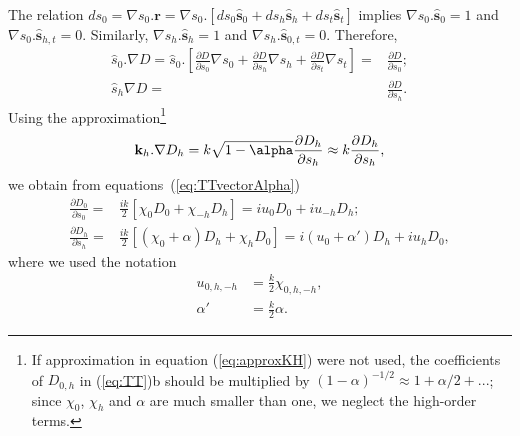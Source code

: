 \documentclass[preprint]{iucr}              %
\begin{document}
The relation $d s_0 = \nabla s_0 . \textbf{r}= \nabla s_0 . [ d s_0 \hat{\textbf{s}}_0 + d s_h \hat{\textbf{s}}_h + d s_t \hat{\textbf{s}}_t ]$ implies $\nabla s_0 . \hat{\textbf{s}}_0=1$ and $\nabla s_0 . \hat{\textbf{s}}_{h,t}=0$. Similarly, $\nabla s_h . \hat{\textbf{s}}_h=1$ and $\nabla s_h . \hat{\textbf{s}}_{0,t}=0$. Therefore, 
\begin{subequations}
\label{eq:equalities}
\begin{align}
\hat s_0 . \nabla D=
\hat s_0 . \left[ 
\frac{\partial D}{\partial s_0} \nabla s_0 + 
\frac{\partial D}{\partial s_h} \nabla s_h +
\frac{\partial D}{\partial s_t} \nabla s_t
\right] 
=& \frac{\partial D}{\partial s_0}
; \\
\hat s_h \nabla D =& 
\frac{\partial D}{\partial s_h}.
\end{align}
\end{subequations}
Using the approximation\footnote{
If approximation in equation (\ref{eq:approxKH}) were not used, the coefficients of $D_{0,h}$ in (\ref{eq:TT})b should be multiplied by $(1-\alpha)^{-1/2} \approx 1 + \alpha/2 + ...$; since $\chi_0$, $\chi_h$ and $\alpha$ are much smaller than one, we neglect the high-order terms.
}
\begin{equation}\label{eq:approxKH}
\textbf k_h . \nabla D_h = 
k \sqrt{1-\alpha} \frac{\partial D_h}{\partial s_h}
\approx k \frac{\partial D_h}{ \partial s_h},
\end{equation}
we obtain from equations~(\ref{eq:TTvectorAlpha})
\begin{subequations}\label{eq:TT}
\begin{align}
\frac{\partial D_0}{\partial s_0} =& \frac{ik}{2} \left[ \chi_0 D_0+ \chi_{-h} D_h \right] = i u_0 D_0 + i u_{-h} D_h; \\
\frac{\partial D_h}{\partial s_h} =& \frac{ik}{2} \left[ (\chi_0 + \alpha) D_h+ \chi_{h} D_0 \right] = i (u_0 + \alpha') D_h + i u_h D_0,
\end{align}
\end{subequations}
where we used the notation 
\begin{subequations}
\label{eq:uandalphaprime}
\begin{align}
    u_{0,h,-h}&=\frac{k}{2} \chi_{0,h,-h},  \\
     \alpha'  &= \frac{k}{2}  \alpha.
\end{align}
\end{subequations}
\end{document}
